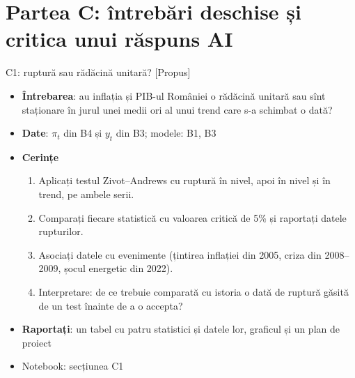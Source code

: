 \section{Partea C: întrebări deschise și critica unui răspuns AI}

\begin{frame}{C1: ruptură sau rădăcină unitară? [Propus]}
\itemsize{\footnotesize}
\begin{itemize}
\item \textbf{Întrebarea}: au inflația și PIB-ul României o rădăcină unitară sau sînt staționare în jurul unei medii ori al unui trend care s-a schimbat o dată?
\item \textbf{Date}: $\pi_t$ din B4 și $y_t$ din B3; modele: B1, B3
\item \textbf{Cerințe}
\begin{enumerate}
    \item Aplicați testul Zivot--Andrews cu ruptură în nivel, apoi în nivel și în trend, pe ambele serii.
    \item Comparați fiecare statistică cu valoarea critică de 5\% și raportați datele rupturilor.
    \item Asociați datele cu evenimente (țintirea inflației din 2005, criza din 2008--2009, șocul energetic din 2022).
    \item Interpretare: de ce trebuie comparată cu istoria o dată de ruptură găsită de un test înainte de a o accepta?
\end{enumerate}
\item \textbf{Raportați}: un tabel cu patru statistici și datele lor, graficul și un plan de proiect
\item Notebook: secțiunea C1
\end{itemize}
\end{frame}

